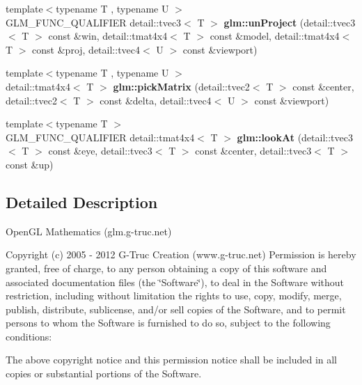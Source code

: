 \begin{DoxyCompactItemize}
\item 
\hypertarget{namespaceglm_ac26506c58c9ef7a530ef94a96a4b2040}{{\footnotesize template$<$typename T , typename U $>$ }\\\-G\-L\-M\-\_\-\-F\-U\-N\-C\-\_\-\-Q\-U\-A\-L\-I\-F\-I\-E\-R \*
detail\-::tvec3$<$ \-T $>$ {\bfseries glm\-::un\-Project} (detail\-::tvec3$<$ \-T $>$ const \&win, detail\-::tmat4x4$<$ \-T $>$ const \&model, detail\-::tmat4x4$<$ \-T $>$ const \&proj, detail\-::tvec4$<$ \-U $>$ const \&viewport)}\label{namespaceglm_ac26506c58c9ef7a530ef94a96a4b2040}

\item 
\hypertarget{namespaceglm_a4e9a9a432ffd6c458b75da1553d22476}{{\footnotesize template$<$typename T , typename U $>$ }\\detail\-::tmat4x4$<$ \-T $>$ {\bfseries glm\-::pick\-Matrix} (detail\-::tvec2$<$ \-T $>$ const \&center, detail\-::tvec2$<$ \-T $>$ const \&delta, detail\-::tvec4$<$ \-U $>$ const \&viewport)}\label{namespaceglm_a4e9a9a432ffd6c458b75da1553d22476}

\item 
\hypertarget{namespaceglm_a28acdf8d2ac672ce637145aa4c11c36a}{{\footnotesize template$<$typename T $>$ }\\\-G\-L\-M\-\_\-\-F\-U\-N\-C\-\_\-\-Q\-U\-A\-L\-I\-F\-I\-E\-R \*
detail\-::tmat4x4$<$ \-T $>$ {\bfseries glm\-::look\-At} (detail\-::tvec3$<$ \-T $>$ const \&eye, detail\-::tvec3$<$ \-T $>$ const \&center, detail\-::tvec3$<$ \-T $>$ const \&up)}\label{namespaceglm_a28acdf8d2ac672ce637145aa4c11c36a}

\end{DoxyCompactItemize}


\subsection{\-Detailed \-Description}
\-Open\-G\-L \-Mathematics (glm.\-g-\/truc.\-net)

\-Copyright (c) 2005 -\/ 2012 \-G-\/\-Truc \-Creation (www.\-g-\/truc.\-net) \-Permission is hereby granted, free of charge, to any person obtaining a copy of this software and associated documentation files (the \char`\"{}\-Software\char`\"{}), to deal in the \-Software without restriction, including without limitation the rights to use, copy, modify, merge, publish, distribute, sublicense, and/or sell copies of the \-Software, and to permit persons to whom the \-Software is furnished to do so, subject to the following conditions\-:

\-The above copyright notice and this permission notice shall be included in all copies or substantial portions of the \-Software.


